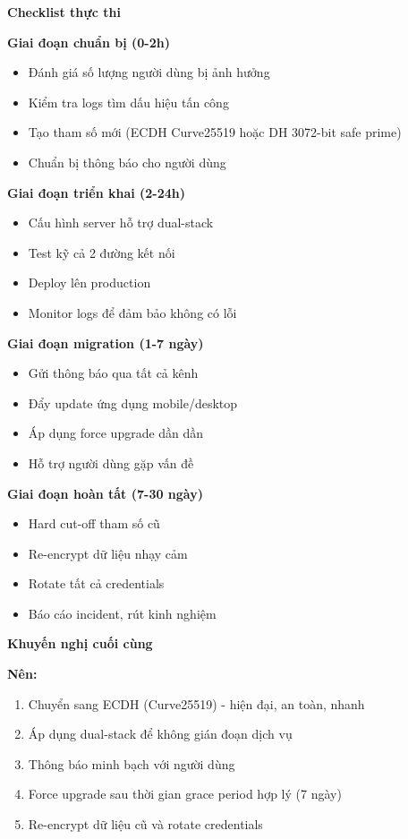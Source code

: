 \textbf{Checklist thực thi}

\textbf{Giai đoạn chuẩn bị (0-2h)}
\begin{itemize}
    \item Đánh giá số lượng người dùng bị ảnh hưởng
    \item Kiểm tra logs tìm dấu hiệu tấn công
    \item Tạo tham số mới (ECDH Curve25519 hoặc DH 3072-bit safe prime)
    \item Chuẩn bị thông báo cho người dùng
\end{itemize}

\textbf{Giai đoạn triển khai (2-24h)}
\begin{itemize}
    \item Cấu hình server hỗ trợ dual-stack
    \item Test kỹ cả 2 đường kết nối
    \item Deploy lên production
    \item Monitor logs để đảm bảo không có lỗi
\end{itemize}

\textbf{Giai đoạn migration (1-7 ngày)}
\begin{itemize}
    \item Gửi thông báo qua tất cả kênh
    \item Đẩy update ứng dụng mobile/desktop
    \item Áp dụng force upgrade dần dần
    \item Hỗ trợ người dùng gặp vấn đề
\end{itemize}

\textbf{Giai đoạn hoàn tất (7-30 ngày)}
\begin{itemize}
    \item Hard cut-off tham số cũ
    \item Re-encrypt dữ liệu nhạy cảm
    \item Rotate tất cả credentials
    \item Báo cáo incident, rút kinh nghiệm
\end{itemize}

\textbf{Khuyến nghị cuối cùng}

\textbf{Nên:}
\begin{enumerate}
    \item Chuyển sang ECDH (Curve25519) - hiện đại, an toàn, nhanh
    \item Áp dụng dual-stack để không gián đoạn dịch vụ
    \item Thông báo minh bạch với người dùng
    \item Force upgrade sau thời gian grace period hợp lý (7 ngày)
    \item Re-encrypt dữ liệu cũ và rotate credentials
\end{enumerate}

